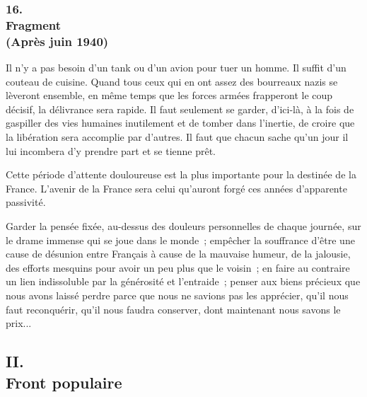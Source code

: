 \documentclass[french,twoside]{book} %
\begin{document}
\subsubsection[16. Fragment, (Après juin 1940)]{16. \\
Fragment \\
(Après juin 1940)}
\noindent \par
Il n'y a pas besoin d'un tank ou d'un avion pour tuer un homme. Il suffit d'un couteau de cuisine. Quand tous ceux qui en ont assez des bourreaux nazis se lèveront ensemble, en même temps que les forces armées frapperont le coup décisif, la délivrance sera rapide. Il faut seulement se garder, d'ici-là, à la fois de gaspiller des vies humaines inutilement et de tomber dans l'inertie, de croire que la libération sera accomplie par d'autres. Il faut que chacun sache qu'un jour il lui incombera d'y prendre part et se tienne prêt.\par
Cette période d'attente douloureuse est la plus importante pour la destinée de la France. L'avenir de la France sera celui qu'auront forgé ces années d'apparente passivité.\par
Garder la pensée fixée, au-dessus des douleurs personnelles de chaque journée, sur le drame immense qui se joue dans le monde ; empêcher la souffrance d'être une cause de désunion entre Français à cause de la mauvaise humeur, de la jalousie, des efforts mesquins pour avoir un peu plus que le voisin ; en faire au contraire un lien indissoluble par la générosité et l'entraide ; penser aux biens précieux que nous avons laissé perdre parce que nous ne savions pas les apprécier, qu'il nous faut reconquérir, qu'il nous faudra conserver, dont maintenant nous savons le prix...\par

\begin{center}
\end{center}
\subsection[II. Front populaire]{II. \\
Front populaire}
\end{document}
